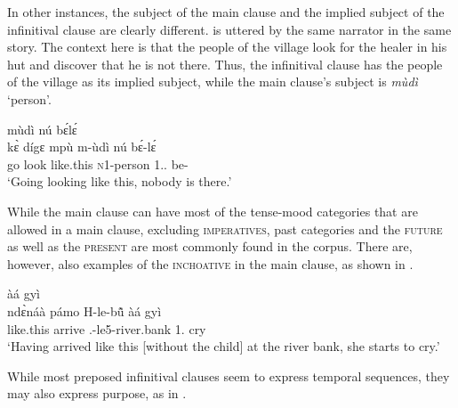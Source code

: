 

In other instances, the subject of the main clause and the implied subject of the infinitival clause are clearly different.  is uttered by the same narrator in the same story. The context here is that the people of the village look for the healer in his hut and discover that he is not there. Thus, the infinitival clause has the people of the village as its implied subject, while the main clause's subject is {\itshape mùdì} `person'.


\ea\label{INFpre4}
  \glll  [kɛ̀ dígɛ̀ mpù]\textsubscript{{\SUB}} mùdì nú bɛ́lɛ́  \\
          {\db}kɛ̀ dígɛ mpù m-ùdì nú bɛ́-lɛ́ \\
          {\db}go look like.this \textsc{n}1-person 1.{\DEM}.{\DIST} be-{\NEG}\\
    \trans `Going looking like this, nobody is there.'
\z


While the main clause can have most of the tense-mood categories that are allowed in a main clause, excluding \textsc{imperatives}, past categories and the \textsc{future} as well as the \textsc{present} are most commonly found in the corpus. There are, however, also examples of the \textsc{inchoative} in the main clause, as shown in .


\ea\label{INFpre5}
  \glll  [ndɛ̀náà pámò lébũ̂]\textsubscript{{\SUB}} àá gyì\\
         {\db}ndɛ̀náà pámo H-le-bũ̂ àá gyì\\
        {\db}like.this arrive {\OBJ}.{\LINK}-le5-river.bank 1.{\INCH} cry \\
    \trans `Having arrived like this [without the child] at the river bank, she starts to cry.'
\z

\noindent While most preposed infinitival clauses seem to express temporal sequences, they may also express purpose, as in .


